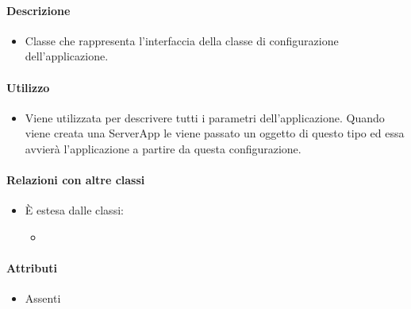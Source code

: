 \paragraph*{Descrizione}
\begin{itemize}
\item[] Classe che rappresenta l'interfaccia della classe di configurazione dell'applicazione.
\end{itemize}

\paragraph*{Utilizzo}
\begin{itemize}
\item[] Viene utilizzata per descrivere tutti i parametri dell'applicazione. Quando viene creata una ServerApp le viene passato un oggetto di questo tipo ed essa avvierà l'applicazione a partire da questa configurazione.
\end{itemize}

\paragraph*{Relazioni con altre classi}
\begin{itemize}

\item[] È estesa dalle classi:
\begin{itemize}
\item {}
\end{itemize}

\end{itemize}

\paragraph*{Attributi}
\begin{itemize}
\item[] Assenti
\end{itemize}

